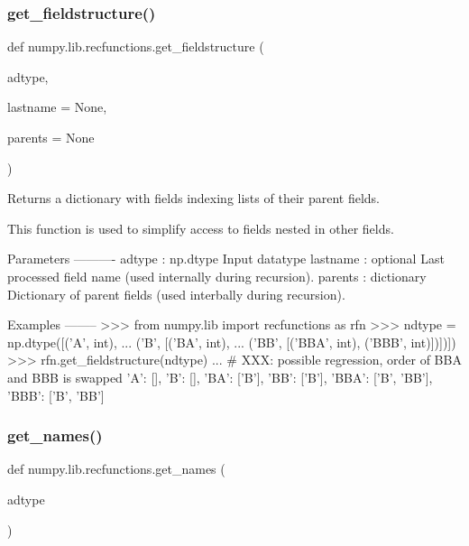 \subsubsection{\texorpdfstring{get\+\_\+fieldstructure()}{get\_fieldstructure()}}
{\footnotesize\ttfamily def numpy.\+lib.\+recfunctions.\+get\+\_\+fieldstructure (\begin{DoxyParamCaption}\item[{}]{adtype,  }\item[{}]{lastname = {\ttfamily None},  }\item[{}]{parents = {\ttfamily None} }\end{DoxyParamCaption})}

\begin{DoxyVerb}Returns a dictionary with fields indexing lists of their parent fields.

This function is used to simplify access to fields nested in other fields.

Parameters
----------
adtype : np.dtype
    Input datatype
lastname : optional
    Last processed field name (used internally during recursion).
parents : dictionary
    Dictionary of parent fields (used interbally during recursion).

Examples
--------
>>> from numpy.lib import recfunctions as rfn
>>> ndtype =  np.dtype([('A', int),
...                     ('B', [('BA', int),
...                            ('BB', [('BBA', int), ('BBB', int)])])])
>>> rfn.get_fieldstructure(ndtype)
... # XXX: possible regression, order of BBA and BBB is swapped
{'A': [], 'B': [], 'BA': ['B'], 'BB': ['B'], 'BBA': ['B', 'BB'], 'BBB': ['B', 'BB']}\end{DoxyVerb}
 \mbox{\label{namespacenumpy_1_1lib_1_1recfunctions_a985f24a4b67176961d58902435d42700}} 
\subsubsection{\texorpdfstring{get\+\_\+names()}{get\_names()}}
{\footnotesize\ttfamily def numpy.\+lib.\+recfunctions.\+get\+\_\+names (\begin{DoxyParamCaption}\item[{}]{adtype }\end{DoxyParamCaption})}

